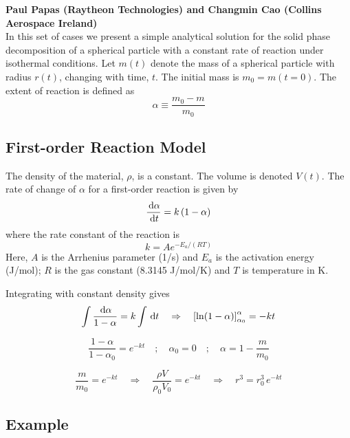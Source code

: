 \documentclass[11pt]{book}
\begin{document}
\textbf{Paul Papas (Raytheon Technologies) and Changmin Cao (Collins Aerospace Ireland)}\\

In this set of cases we present a simple analytical solution for the solid phase decomposition of a spherical particle with a constant rate of reaction under isothermal conditions.  Let $m(t)$ denote the mass of a spherical particle with radius $r(t)$, changing with time, $t$.  The initial mass is $m_0 = m(t=0)$.  The extent of reaction is defined as
\begin{equation}
\alpha \equiv \frac{m_0-m}{m_0}
\end{equation}

\subsection*{First-order Reaction Model}

The density of the material, $\rho$, is a constant.  The volume is denoted $V(t)$.  The rate of change of $\alpha$ for a first-order reaction is given by \cite{Khawam:2006}
\begin{equation}
\frac{\,\mathrm{d} \alpha}{\,\mathrm{d} t} = k \, (1-\alpha)
\end{equation}
where the rate constant of the reaction is
\begin{equation}
k = A e^{-E_a/(RT)}
\end{equation}
Here, $A$ is the Arrhenius parameter (1/s) and $E_a$ is the activation energy (J/mol); $R$ is the gas constant (8.3145 J/mol/K) and $T$ is temperature in K.

Integrating with constant density gives
\begin{equation}
\int \frac{\,\mathrm{d} \alpha}{1-\alpha} = k \int \,\mathrm{d} t \quad \Rightarrow \quad \left[\ln(1-\alpha)\right]_{\alpha_0}^{\alpha} = -k t
\end{equation}

\begin{equation}
\frac{1-\alpha}{1-\alpha_0} = e^{-kt} \quad ; \quad \alpha_0=0 \quad ; \quad \alpha = 1-\frac{m}{m_0}
\end{equation}

\begin{equation}
\frac{m}{m_0} = e^{-k t} \quad \Rightarrow \quad \frac{\rho V}{\rho_0 V_0} = e^{-k t} \quad \Rightarrow \quad r^3 = r_0^3 \, e^{-k t}
\end{equation}

\subsection*{Example}
\end{document}
